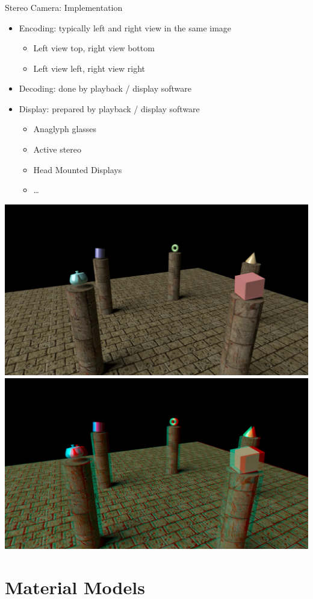 \documentclass[utf8,stillsansserifmath,fleqn,t]{beamer}
\begin{document}
\begin{frame}
\frametitle{\insertsection}
Stereo Camera: Implementation
\begin{itemize}
\item Encoding: typically left and right view in the same image
    \begin{itemize}
    \item Left view top, right view bottom
    \item Left view left, right view right
    \end{itemize}
\item Decoding: done by playback / display software
\item Display: prepared by playback / display software
    \begin{itemize}
    \item Anaglyph glasses
    \item Active stereo
    \item Head Mounted Displays
    \item \ldots{}
    \end{itemize}
\end{itemize}
\includegraphics[width=.49\textwidth]{./fig/mpt-animations-left.jpg}\hfill
\includegraphics[width=.49\textwidth]{./fig/mpt-animations-anaglyph.jpg}
\end{frame}

\section{Material Models}
\end{document}
